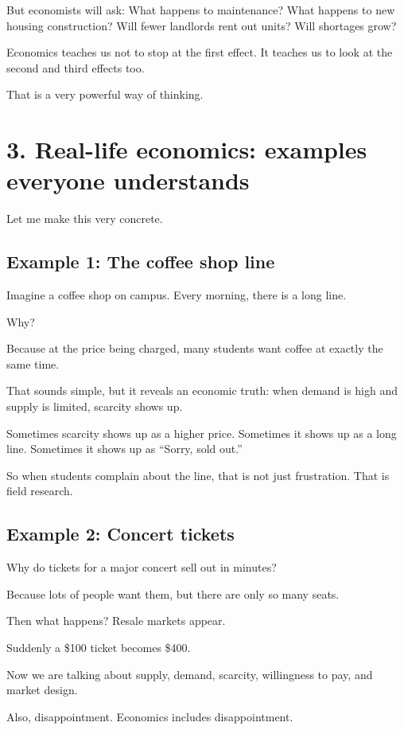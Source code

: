 \documentclass[12pt]{article}
\begin{document}
But economists will ask:  
What happens to maintenance?  
What happens to new housing construction?  
Will fewer landlords rent out units?  
Will shortages grow?

Economics teaches us not to stop at the first effect.  
It teaches us to look at the second and third effects too.

That is a very powerful way of thinking.

\section*{3. Real-life economics: examples everyone understands}

Let me make this very concrete.

\subsection*{Example 1: The coffee shop line}

Imagine a coffee shop on campus. Every morning, there is a long line.

Why?

Because at the price being charged, many students want coffee at exactly the same time.

That sounds simple, but it reveals an economic truth:  
when demand is high and supply is limited, scarcity shows up.

Sometimes scarcity shows up as a higher price.  
Sometimes it shows up as a long line.  
Sometimes it shows up as ``Sorry, sold out.''

So when students complain about the line, that is not just frustration. That is field research.

\subsection*{Example 2: Concert tickets}

Why do tickets for a major concert sell out in minutes?

Because lots of people want them, but there are only so many seats.

Then what happens? Resale markets appear.

Suddenly a \$100 ticket becomes \$400.

Now we are talking about supply, demand, scarcity, willingness to pay, and market design.

Also, disappointment. Economics includes disappointment.
\end{document}
